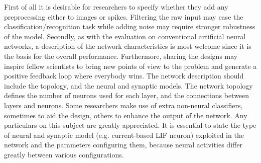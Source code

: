 First of all it is desirable for researchers to specify whether they add any preprocessing either to images or spikes.
Filtering the raw input may ease the classification/recognition task while adding noise may require stronger robustness of the model.
Secondly, as with the evaluation on conventional artificial neural networks, a description of the network characteristics is most welcome since it is the basis for the overall performance.
Furthermore, sharing the designs may inspire fellow scientists to bring new points of view to the problem and generate a positive feedback loop where everybody wins.
The network description should include the topology, and the neural and synaptic models.
The network topology defines the number of neurons used for each layer, and the connections between layers and neurons.
Some researchers make use of extra non-neural classifiers, sometimes to aid the design, others to enhance the output of the network.
Any particulars on this subject are greatly appreciated.
It is essential to state the type of neural and synaptic model (e.g. current-based LIF neuron) exploited in the network and the parameters configuring them, because neural activities differ greatly between various configurations.
